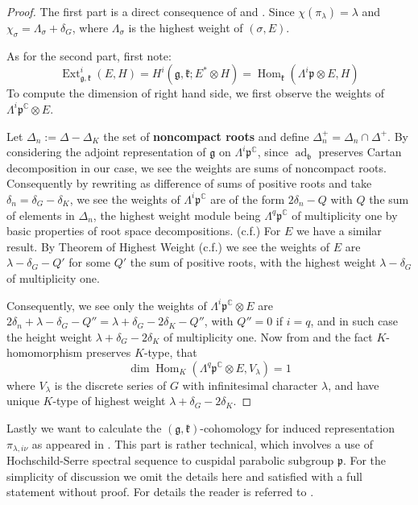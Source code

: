 \documentclass[11pt]{report}
\theoremstyle{definition}
\theoremstyle{plain}
\DeclareMathOperator{\ad}{ad}
\DeclareMathOperator{\Ext}{Ext}
\DeclareMathOperator{\Hom}{Hom}
\newcommand{\complex}{\mathbb{C}}
\newcommand{\Lie}[1]{\mathfrak{#1}}
\begin{document}
\begin{proof}
	The first part is a direct consequence of  and . Since $\chi(\pi_\lambda)=\lambda$ and $\chi_\sigma=\Lambda_\sigma+\delta_G$, where $\Lambda_\sigma$ is the highest weight of $(\sigma,E)$.
	\par As for the second part, first note:
	\begin{equation}
	\Ext^i_{\Lie{g,k}}(E,H)=H^i(\Lie{g,k};E^*\otimes H)=\Hom_{\Lie{k}}(\Lambda^i\Lie{p}\otimes E, H)
	\end{equation}
	To compute the dimension of right hand side, we first observe the weights of $\Lambda^i\Lie{p}^\complex\otimes E$. \par Let $\Delta_n:=\Delta-\Delta_K$ the set of \textbf{noncompact roots} and define $\Delta^+_n=\Delta_n\cap \Delta^+$. By considering the adjoint representation of $\Lie{g}$ on $\Lambda^i\Lie{p}^\complex$, since $\ad_{\Lie{b}}$ preserves Cartan decomposition in our case, we see the weights are sums of noncompact roots. Consequently by rewriting as difference of sums of positive roots and take $\delta_n=\delta_G-\delta_K$, we see the weights of $\Lambda^i\Lie{p}^\complex$ are of the form $2\delta_n-Q$ with $Q$ the sum of elements in $\Delta_n$, the highest weight module being $\Lambda^q\Lie{p}^\complex$ of multiplicity one by basic properties of root space decompositions. (c.f.\cite[Proposition~4.1]{knapp2016}) For $E$ we have a similar result. By Theorem of Highest Weight (c.f.\cite[Theorem~5.5]{knapp2013}) we see the weights of $E$ are $\lambda-\delta_G-Q'$ for some $Q'$ the sum of positive roots, with the highest weight $\lambda-\delta_G$ of multiplicity one. 
	\par Consequently, we see only the weights of $\Lambda^i\Lie{p}^\complex \otimes E$ are $2\delta_n+\lambda-\delta_G-Q''=\lambda+\delta_G-2\delta_K-Q''$, with $Q''=0$ if $i=q$, and in such case the height weight $\lambda+\delta_G-2\delta_K$ of multiplicity one. Now from  and the fact $K$-homomorphism preserves $K$-type, that 
	\begin{equation}
	\dim\Hom_K(\Lambda^q\Lie{p}^\complex\otimes E,V_\lambda)=1
	\end{equation}
	 where $V_\lambda$ is the discrete series of $G$ with infinitesimal character $\lambda$, and have unique $K$-type of highest weight $\lambda+\delta_G-2\delta_K$.
\end{proof}
Lastly we want to calculate the $(\Lie{g,k})$-cohomology for induced representation $\pi_{\lambda, i\nu}$ as appeared in . This part is rather technical, which involves a use of Hochschild-Serre spectral sequence \cite[Theorem~6.5]{borel2013} to cuspidal parabolic subgroup $\Lie{p}$. For the simplicity of discussion we omit the details here and satisfied with a full statement without proof. For details the reader is referred to \cite[Chapter~III, Theorem~3.3 \&Theorem 5.1]{borel2013}.
\end{document}
